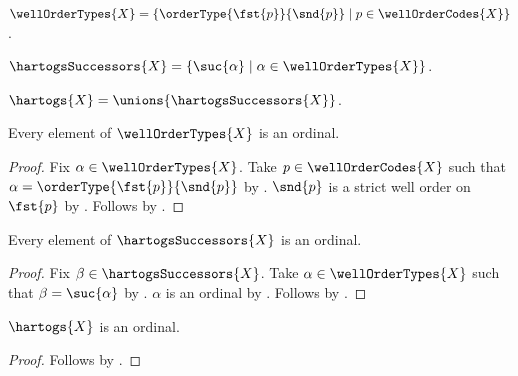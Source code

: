 \begin{definition}\label{well_order_types}
    $\wellOrderTypes{X}
        =\{\orderType{\fst{p}}{\snd{p}}\mid
            p\in\wellOrderCodes{X}\}$.
\end{definition}

\begin{definition}\label{hartogs_successors}
    $\hartogsSuccessors{X}
        =\{\suc{\alpha}\mid\alpha\in\wellOrderTypes{X}\}$.
\end{definition}

\begin{definition}\label{hartogs}
    $\hartogs{X}=\unions{\hartogsSuccessors{X}}$.
\end{definition}

\begin{proposition}\label{well_order_type_family_is_ordinal}
    Every element of $\wellOrderTypes{X}$ is an ordinal.
\end{proposition}
\begin{proof}
    Fix $\alpha\in\wellOrderTypes{X}$.
    Take $p\in\wellOrderCodes{X}$ such that
        $\alpha=\orderType{\fst{p}}{\snd{p}}$
        by .
    $\snd{p}$ is a strict well order on $\fst{p}$
        by .
    Follows by .
\end{proof}

\begin{proposition}\label{hartogs_successor_family_is_ordinal}
    Every element of $\hartogsSuccessors{X}$ is an ordinal.
\end{proposition}
\begin{proof}
    Fix $\beta\in\hartogsSuccessors{X}$.
    Take $\alpha\in\wellOrderTypes{X}$ such that $\beta=\suc{\alpha}$
        by .
    $\alpha$ is an ordinal by .
    Follows by .
\end{proof}

\begin{theorem}\label{hartogs_is_ordinal}
    $\hartogs{X}$ is an ordinal.
\end{theorem}
\begin{proof}
    Follows by
        .
\end{proof}

